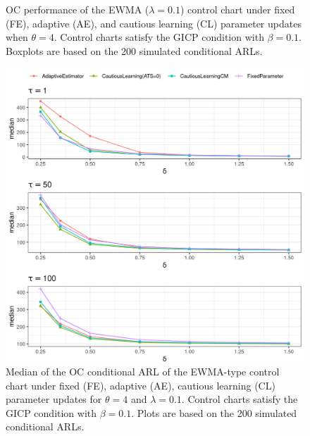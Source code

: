 \begin{figure}
\begin{subfigure}{0.49\textwidth}
\end{subfigure}
  \caption{OC performance of the EWMA ($ \lambda = 0.1$) control chart under fixed (FE), adaptive (AE), and cautious learning (CL) parameter updates when $ \theta = 4$.
    Control charts satisfy the GICP condition  with $ \beta = 0.1$.
  Boxplots are based on the 200 simulated conditional ARLs.}
  \label{fig:lambda=0.10/EWMA OC theta=4}
\end{figure}

\begin{figure}
  \includegraphics[width=\textwidth]{img/sims/theta=4.0_signedEWMA(l = 0.1, upw = true, L = 1.0)/OC-profiles.png}
  \caption{Median of the OC conditional ARL of the EWMA-type control chart under fixed (FE), adaptive (AE), cautious learning (CL) parameter updates for $ \theta = 4$ and $ \lambda = 0.1$.
    Control charts satisfy the GICP condition  with $ \beta = 0.1$.
  Plots are based on the 200 simulated conditional ARLs.}
  \label{fig:lambda=0.05/EWMA OC profiles}
\end{figure}


